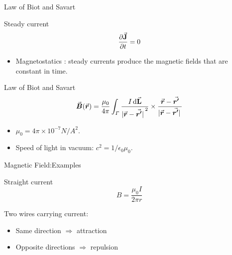 \documentclass{beamer}
\begin{document}

\begin{frame}{Law of Biot and Savart}
    \begin{block}{Steady current}
        \begin{equation}
            \pdv{\va{J}}{t} = 0
        \end{equation}
    \end{block}

    \begin{itemize}
        \item Magnetostatics : steady currents produce the magnetic fields that are constant in time.
    \end{itemize}
    

    \begin{beamerboxesrounded}{Law of Biot and Savart}
        \begin{equation}
            \va*{B}(\va*{r}) = \frac{\mu_0}{4\pi} \int_{\varGamma} \frac{I \dd{\va{L}} }{\abs*{\va*{r}-\va*{r'}}^2} \times \frac{\va*{r}-\va*{r'}}{\abs*{\va*{r}-\va*{r'}}}
        \end{equation}      
        \begin{itemize}
            \item $\mu_0=\unit{4\pi\times 10^{-7}}{N/A^2}$.
            \item Speed of light in vacuum: $c^2 = 1/ \epsilon_0 \mu_0$.
        \end{itemize}
    \end{beamerboxesrounded}
\end{frame}



\begin{frame}{Magnetic Field:Examples}
    \begin{block}{Straight current}
        \begin{equation}
            B = \frac{\mu_0 I}{2 \pi r}
        \end{equation}
    \end{block}
    \vfill
    Two wires carrying current: 
        \begin{itemize}
            \item Same direction $\Rightarrow$ attraction 
            \item Opposite directions $\Rightarrow$ repulsion
        \end{itemize}
\end{frame}
\end{document}
